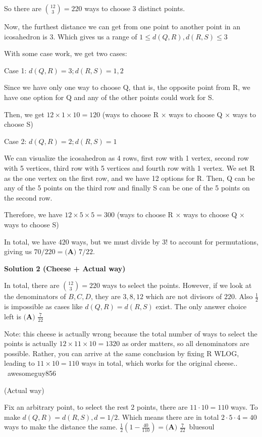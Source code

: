 \begin{enumerate}
 So there are $\binom{12}{3} = 220$ ways to choose 3 distinct points.

 Now, the furthest distance we can get from one point to another point in an icosahedron is 3. Which gives us a range of $1 \leq d(Q, R), d(R, S) \leq 3$

 With some case work, we get two cases:

 Case 1: $d(Q, R) = 3; d(R, S) = 1, 2$

 Since we have only one way to choose Q, that is, the opposite point from R, we have one option for Q and any of the other points could work for S.

 Then, we get $12 \times 1 \times 10 = 120$ (ways to choose R × ways to choose Q × ways to choose S)

 Case 2: $d(Q, R) = 2; d(R, S) = 1$

 We can visualize the icosahedron as 4 rows, first row with 1 vertex, second row with 5 vertices, third row with 5 vertices and fourth row with 1 vertex. We set R as the one vertex on the first row, and we have 12 options for R. Then, Q can be any of the 5 points on the third row and finally S can be one of the 5 points on the second row.

 Therefore, we have $12 \times 5 \times 5 = 300$ (ways to choose R × ways to choose Q × ways to choose S)

 In total, we have $420$ ways, but we must divide by $3!$ to account for permutations, giving us $70/220 = \boxed{\textbf{(A) } 7/22}.$




\textbf{Solution 2 (Cheese + Actual way)}

In total, there are $\binom{12}{3}=220$ ways to select the points. However, if we look at the denominators of $B,C,D$, they are $3,8,12$ which are not divisors of $220$. Also $\frac{1}{2}$ is impossible as cases like $d(Q, R) = d(R, S)$ exist. The only answer choice left is $\boxed{\textbf{(A) } \frac{7}{22}}$

 Note: this cheese is actually wrong because the total number of ways to select the points is actually $12 \times 11 \times 10 = 1320$ as order matters, so all denominators are possible. Rather, you can arrive at the same conclusion by fixing R WLOG, leading to $11 \times 10 = 110$ ways in total, which works for the original cheese.. ~awesomeguy856

 (Actual way)

 Fix an arbitrary point, to select the rest $2$ points, there are $11\cdot 10 =110$ ways. To make $d(Q, R)=d(R, S), d=1/2$. Which means there are in total $2\cdot 5 \cdot 4 = 40$ ways to make the distance the same. $\frac{1}{2}(1-\frac{40}{110})= \boxed{\textbf{(A) } \frac{7}{22}}$~bluesoul


\end{enumerate}
